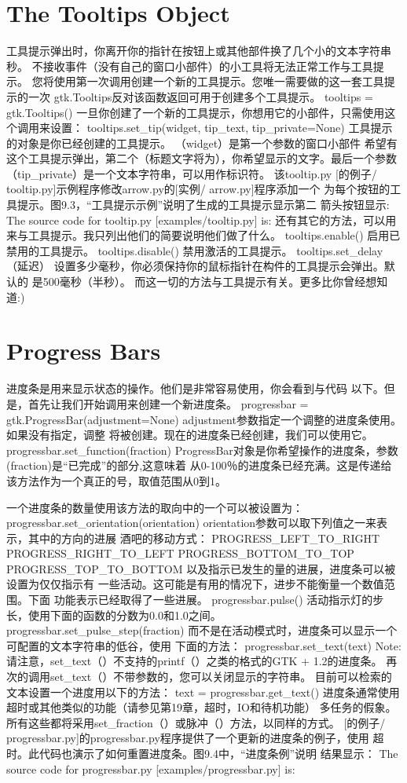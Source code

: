 \section{The Tooltips Object}
工具提示弹出时，你离开你的指针在按钮上或其他部件换了几个小的文本字符串
秒。
不接收事件（没有自己的窗口小部件）的小工具将无法正常工作与工具提示。
您将使用第一次调用创建一个新的工具提示。您唯一需要做的这一套工具提示的一次
gtk.Tooltips反对该函数返回可用于创建多个工具提示。	
tooltips = gtk.Tooltips()
一旦你创建了一个新的工具提示，你想用它的小部件，只需使用这个调用来设置：
tooltips.set_tip(widget, tip_text, tip_private=None)
工具提示的对象是你已经创建的工具提示。 （widget）是第一个参数的窗口小部件
希望有这个工具提示弹出，第二个（标题文字将为），你希望显示的文字。最后一个参数
（tip_private）是一个文本字符串，可以用作标识符。
该tooltip.py [的例子/ tooltip.py]示例程序修改arrow.py的[实例/ arrow.py]程序添加一个
为每个按钮的工具提示。图9.3，“工具提示示例”说明了生成的工具提示显示第二
箭头按钮显示:
The source code for tooltip.py [examples/tooltip.py] is:
还有其它的方法，可以用来与工具提示。我只列出他们的简要说明他们做了什么。
tooltips.enable()
启用已禁用的工具提示。	
tooltips.disable()
禁用激活的工具提示。
tooltips.set_delay（延迟）
设置多少毫秒，你必须保持你的鼠标指针在构件的工具提示会弹出。默认的
是500毫秒（半秒）。
而这一切的方法与工具提示有关。更多比你曾经想知道:)
\section{Progress Bars}
进度条是用来显示状态的操作。他们是非常容易使用，你会看到与代码
以下。但是，首先让我们开始调用来创建一个新进度条。
progressbar = gtk.ProgressBar(adjustment=None)
adjustment参数指定一个调整的进度条使用。如果没有指定，调整
将被创建。现在的进度条已经创建，我们可以使用它。
progressbar.set_function(fraction)
ProgressBar对象是你希望操作的进度条，参数(fraction)是“已完成”的部分,这意味着
从0-100％的进度条已经充满。这是传递给该方法作为一个真正的号，取值范围从0到1。

一个进度条的数量使用该方法的取向中的一个可以被设置为：
progressbar.set_orientation(orientation)
orientation参数可以取下列值之一来表示，其中的方向的进展
酒吧的移动方式：
PROGRESS_LEFT_TO_RIGHT
PROGRESS_RIGHT_TO_LEFT
PROGRESS_BOTTOM_TO_TOP
PROGRESS_TOP_TO_BOTTOM
以及指示已发生的量的进展，进度条可以被设置为仅仅指示有
一些活动。这可能是有用的情况下，进步不能衡量一个数值范围。下面
功能表示已经取得了一些进展。
progressbar.pulse()
活动指示灯的步长，使用下面的函数的分数为0.0和1.0之间。
progressbar.set_pulse_step(fraction)
而不是在活动模式时，进度条可以显示一个可配置的文本字符串的低谷，使用
下面的方法：
progressbar.set_text(text)
Note:
请注意，set_text（）不支持的printf（）之类的格式的GTK + 1.2的进度条。
再次的调用set_text（）不带参数的，您可以关闭显示的字符串。
目前可以检索的文本设置一个进度用以下的方法：
text = progressbar.get_text()
进度条通常使用超时或其他类似的功能（请参见第19章，超时，IO和待机功能）
多任务的假象。所有这些都将采用set_fraction（）或脉冲（）方法，以同样的方式。
[的例子/ progressbar.py]的progressbar.py程序提供了一个更新的进度条的例子，使用
超时。此代码也演示了如何重置进度条。图9.4中，“进度条例”说明
结果显示：
The source code for progressbar.py [examples/progressbar.py] is:

